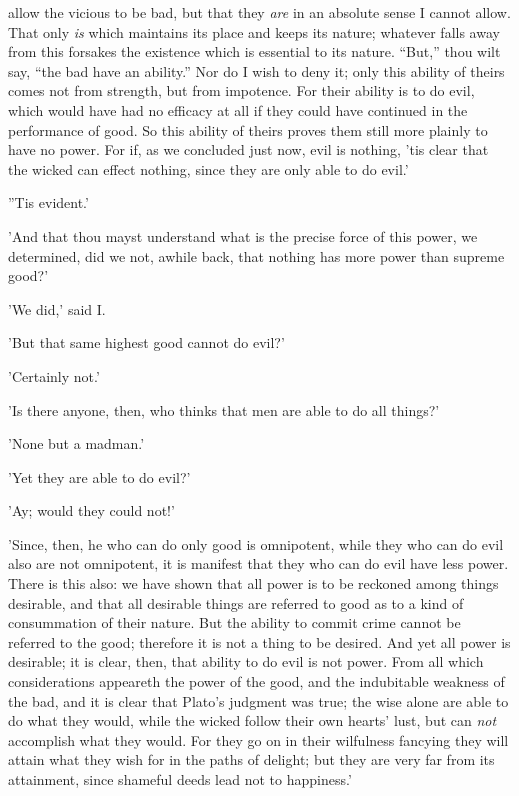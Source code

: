 allow the vicious to be bad, but that they \emph{are} in an absolute sense I
cannot allow. That only \emph{is} which maintains its place and keeps its
nature; whatever falls away from this forsakes the existence which is
essential to its nature. ``But,'' thou wilt say, ``the bad have an
ability.'' Nor do I wish to deny it; only this ability of theirs comes
not from strength, but from impotence. For their ability is to do evil,
which would have had no efficacy at all if they could have continued in
the performance of good. So this ability of theirs proves them still
more plainly to have no power. For if, as we concluded just now, evil is
nothing, 'tis clear that the wicked can effect nothing, since they are
only able to do evil.'

''Tis evident.'

'And that thou mayst understand what is the precise force of this power,
we determined, did we not, awhile back, that nothing has more power than
supreme good?'

'We did,' said I.

'But that same highest good cannot do evil?'

'Certainly not.'

'Is there anyone, then, who thinks that men are able to do all things?'

'None but a madman.'

'Yet they are able to do evil?'

'Ay; would they could not!'

'Since, then, he who can do only good is omnipotent, while they who can
do evil also are not omnipotent, it is manifest that they who can do
evil have less power. There is this also: we have shown that all power
is to be reckoned among things desirable, and that all desirable things
are referred to good as to a kind of consummation of their nature. But
the ability to commit crime cannot be referred to the good; therefore it
is not a thing to be desired. And yet all power is desirable; it is
clear, then, that ability to do evil is not power. From all which
considerations appeareth the power of the good, and the indubitable
weakness of the bad, and it is clear that Plato's judgment was true; the
wise alone are able to do what they would, while the wicked follow their
own hearts' lust, but can \emph{not} accomplish what they would. For they go
on in their wilfulness fancying they will attain what they wish for in
the paths of delight; but they are very far from its attainment, since
shameful deeds lead not to happiness.'


